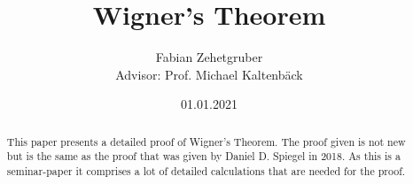 \documentclass{article}
\title
{
  Wigner's Theorem
}
\author
{
  Fabian Zehetgruber \\ [1cm]{\small Advisor: Prof. Michael Kaltenbäck}
}
\date{01.01.2021}
\begin{document}
	
\maketitle

\begin{abstract}
	This paper presents a detailed proof of Wigner's Theorem. The proof given is not new but is the same as the proof that was given by Daniel D. Spiegel in 2018. As this is a seminar-paper it comprises a lot of detailed calculations that are needed for the proof.
\end{abstract}















\printbibliography
\end{document}
